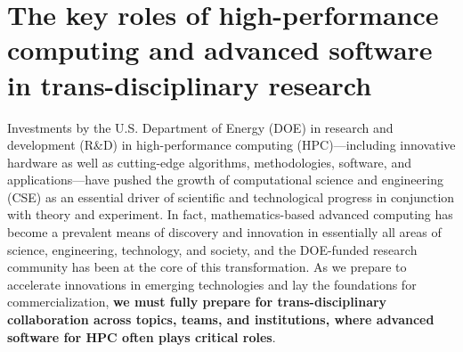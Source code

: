 
\iffalse
{\bf Definitions of trans-disciplinary research and multi-disciplinary research}

Trans-disciplinary research involves the integration of knowledge and methods from multiple disciplines in order to address a complex problem or issue. It involves the collaboration of experts from diverse fields, who work together to find solutions to problems that cannot be solved by a single discipline.

On the other hand, multi-disciplinary research involves the collaboration of researchers from different disciplines, but each researcher brings their own perspective and expertise to the problem being studied. In multi-disciplinary research, the focus is on bringing together different perspectives and approaches in order to gain a more complete understanding of the problem.

In summary, trans-disciplinary research involves a more holistic approach to problem-solving, while multi-disciplinary research involves the integration of different perspectives on a problem.
\fi

\section*{The key roles of high-performance computing and advanced software in trans-disciplinary research}


Investments by the U.S. Department of Energy (DOE) in research and development (R\&D) in high-performance computing (HPC)---including innovative hardware as well as cutting-edge algorithms, methodologies, software, and applications---have pushed the growth of computational science and engineering (CSE) as an essential driver of scientific and technological progress in conjunction with theory and experiment.  In fact, mathematics-based advanced computing has become a prevalent means of discovery and innovation in essentially all areas of science, engineering, technology, and society, and the DOE-funded research community has been at the core of this transformation.
As we prepare to accelerate innovations in emerging technologies and lay the foundations for commercialization, {\bf we must fully prepare for trans-disciplinary collaboration across topics, teams, and institutions, where advanced software for HPC often plays critical roles}. 

